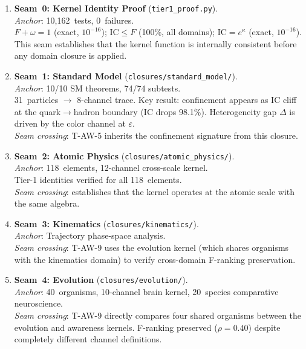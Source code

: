 \documentclass[
  aps,
  prd,
  twocolumn,
  superscriptaddress,
  nofootinbib,
  floatfix
]{revtex4-2}
\newcommand{\eps}{\varepsilon}
\newcommand{\IC}{\mathrm{IC}}
\begin{document}
\begin{enumerate}
\item \textbf{Seam~0: Kernel Identity Proof}
  (\texttt{tier1\_proof.py}).\\
  \emph{Anchor}: 10,162~tests, 0~failures.\\
  $F + \omega = 1$ (exact, $10^{-16}$);
  $\IC \leq F$ (100\%, all domains);
  $\IC = e^\kappa$ (exact, $10^{-16}$).\\
  This seam establishes that the kernel function is
  internally consistent before any domain closure is
  applied.

\item \textbf{Seam~1: Standard Model}
  (\texttt{closures/standard\_model/}).\\
  \emph{Anchor}: 10/10 SM theorems, 74/74 subtests.\\
  31~particles $\to$ 8-channel trace.  Key result:
  confinement appears as IC cliff at the quark$\to$hadron
  boundary (IC drops 98.1\%).  Heterogeneity gap $\Delta$
  is driven by the color channel at $\eps$.\\
  \emph{Seam crossing}: T-AW-5 inherits the confinement
  signature from this closure.

\item \textbf{Seam~2: Atomic Physics}
  (\texttt{closures/atomic\_physics/}).\\
  \emph{Anchor}: 118~elements, 12-channel cross-scale
  kernel.\\
  Tier-1 identities verified for all 118~elements.\\
  \emph{Seam crossing}: establishes that the kernel
  operates at the atomic scale with the same algebra.

\item \textbf{Seam~3: Kinematics}
  (\texttt{closures/kinematics/}).\\
  \emph{Anchor}: Trajectory phase-space analysis.\\
  \emph{Seam crossing}: T-AW-9 uses the evolution kernel
  (which shares organisms with the kinematics domain)
  to verify cross-domain F-ranking preservation.

\item \textbf{Seam~4: Evolution}
  (\texttt{closures/evolution/}).\\
  \emph{Anchor}: 40~organisms, 10-channel brain kernel,
  20~species comparative neuroscience.\\
  \emph{Seam crossing}: T-AW-9 directly compares four
  shared organisms between the evolution and awareness
  kernels. F-ranking preserved ($\rho = 0.40$) despite
  completely different channel definitions.


\end{enumerate}
\end{document}

